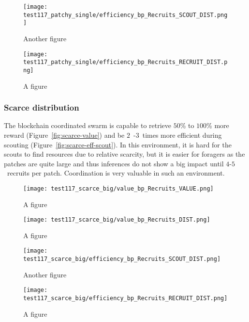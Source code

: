 \documentclass[runningheads]{llncs}
\begin{document}
\begin{figure}
\centering
\begin{minipage}{.495\textwidth}
  \centering
  \texttt{[image: test117\_patchy\_single/efficiency\_bp\_Recruits\_SCOUT\_DIST.png]}
  \caption{Another figure}
  \label{fig:test2}
\end{minipage}
\begin{minipage}{.495\textwidth}
  \centering
  \texttt{[image: test117\_patchy\_single/efficiency\_bp\_Recruits\_RECRUIT\_DIST.png]}
  \caption{A figure}
  \label{fig:test1}
\end{minipage}
\end{figure}


\subsubsection{Scarce distribution}

The blockchain coordinated swarm is capable to retrieve $50$\% to $100$\% more reward (Figure~\ref{fig:scarce-value}) and be $2$~-$3$~times more efficient during scouting (Figure~\ref{fig:scarce-eff-scout}). In this environment, it is hard for the scouts to find resources due to relative scarcity, but it is easier for foragers as the patches are quite large and thus inferences do not show a big impact until $4$-$5$~recruits per patch. Coordination is very valuable in such an environment.

\begin{figure}
\centering
\begin{minipage}{.495\textwidth}
  \centering
  \texttt{[image: test117\_scarce\_big/value\_bp\_Recruits\_VALUE.png]}
  \caption{A figure}
  \label{fig:scarce-value}
\end{minipage}
\begin{minipage}{.495\textwidth}
  \centering
  \texttt{[image: test117\_scarce\_big/value\_bp\_Recruits\_DIST.png]}
  \caption{A figure}
  \label{fig:scarce-dist}
\end{minipage}
\end{figure}

\begin{figure}
\centering
\begin{minipage}{.495\textwidth}
  \centering
  \texttt{[image: test117\_scarce\_big/efficiency\_bp\_Recruits\_SCOUT\_DIST.png]}
  \caption{Another figure}
  \label{fig:scarce-eff-scout}
\end{minipage}
\begin{minipage}{.495\textwidth}
  \centering
  \texttt{[image: test117\_scarce\_big/efficiency\_bp\_Recruits\_RECRUIT\_DIST.png]}
  \caption{A figure}
  \label{fig:scarce-eff-recruit}
\end{minipage}
\end{figure}
\end{document}
